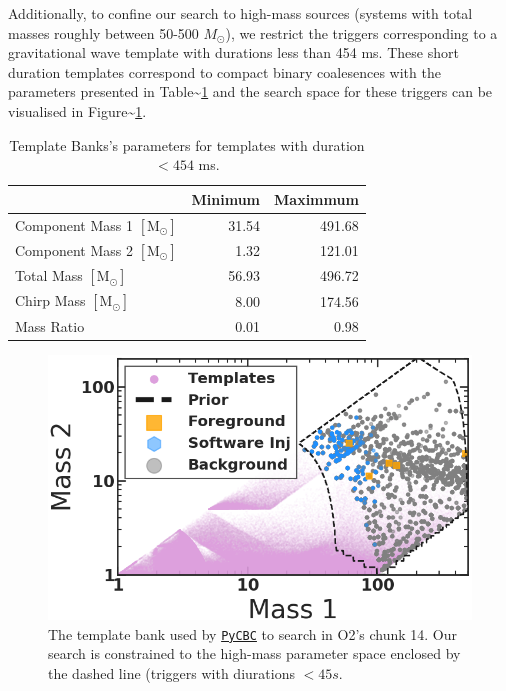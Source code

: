 \documentclass[%
 reprint,
 amsmath,amssymb,
 aps,
]{revtex4-2}
\begin{document}
Additionally, to confine our search to high-mass sources (systems with total masses roughly between 50-500
\(M_{\odot}\)), we restrict the triggers corresponding to a gravitational wave template with durations less than 454 ms.
These short duration templates correspond to compact binary coalesences with the parameters presented in
Table\textasciitilde\ref{tab:parameters} and the search space for these triggers can be visualised in Figure\textasciitilde\ref{fig:templateBank}.

\begin{table}[t]

\caption[BBH parameters corresponding to durations $<454$ ms]{\label{tab:parameters}Template Banks's parameters for templates with duration $<454$ ms.}
\centering
\begin{tabular}{lrr}
\toprule
  & Minimum & Maximmum\\
\midrule
Component Mass 1 $[\text{M}_{\odot}]$ & 31.54 & 491.68\\
Component Mass 2 $[\text{M}_{\odot}]$ & 1.32 & 121.01\\
Total Mass $[\text{M}_{\odot}]$ & 56.93 & 496.72\\
Chirp Mass $[\text{M}_{\odot}]$ & 8.00 & 174.56\\
Mass Ratio & 0.01 & 0.98\\
\bottomrule
\end{tabular}
\end{table}



\begin{figure}[!h]

{\centering \includegraphics[width=0.75\linewidth]{images/template_bank_masses} 

}

\caption[High-mass BCR search space.]{The template bank used by \href{https://pycbc.org/}{\texttt{PyCBC}} to search in O2's chunk 14. Our search is constrained to the high-mass parameter space enclosed by the dashed line (triggers with diurations \(<45s\).}\label{fig:templateBank}
\end{figure}
\end{document}
